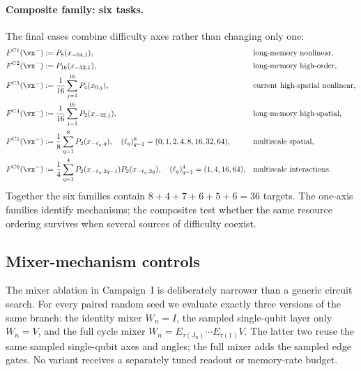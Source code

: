 \paragraph{Composite family: six tasks.}
The final cases combine difficulty axes rather than changing only one:
\begin{align}
F^{\mathrm{C1}}(\vx^-)
   &:=P_8(x_{-64,1}),
   &&\text{long-memory nonlinear},
   \label{eq:atlas-c1}\\
F^{\mathrm{C2}}(\vx^-)
   &:=P_{16}(x_{-32,1}),
   &&\text{long-memory high-order},
   \label{eq:atlas-c2}\\
F^{\mathrm{C3}}(\vx^-)
   &:=\frac1{16}\sum_{j=1}^{16}P_4(x_{0,j}),
   &&\text{current high-spatial nonlinear},
   \label{eq:atlas-c3}\\
F^{\mathrm{C4}}(\vx^-)
   &:=\frac1{16}\sum_{j=1}^{16}P_2(x_{-32,j}),
   &&\text{long-memory high-spatial},
   \label{eq:atlas-c4}\\
F^{\mathrm{C5}}(\vx^-)
   &:=\frac18\sum_{q=1}^{8}P_2(x_{-\ell_q,q}),
   \quad (\ell_q)_{q=1}^8=(0,1,2,4,8,16,32,64),
   &&\text{multiscale spatial},
   \label{eq:atlas-c5}\\
F^{\mathrm{C6}}(\vx^-)
   &:=\frac14\sum_{q=1}^{4}
       P_2(x_{-\ell_q,2q-1})P_2(x_{-\ell_q,2q}),
   \quad (\ell_q)_{q=1}^4=(1,4,16,64),
   &&\text{multiscale interactions}.
   \label{eq:atlas-c6}
\end{align}
Together the six families contain
$8+4+7+6+5+6=36$ targets.  The one-axis families identify mechanisms; the
composites test whether the same resource ordering survives when several
sources of difficulty coexist.

\subsection{Mixer-mechanism controls}
\label{app:mixer-controls}

The mixer ablation in Campaign~I is deliberately narrower than a generic
circuit search.  For every paired random seed we evaluate exactly three
versions of the same branch: the identity mixer $W_n=I$, the sampled
single-qubit layer only $W_n=V$, and the full cycle mixer
$W_n=E_{\tau(J_n)}\cdots E_{\tau(1)}V$.  The latter two reuse the same sampled
single-qubit axes and angles; the full mixer adds the sampled edge gates.  No
variant receives a separately tuned readout or memory-rate budget.

